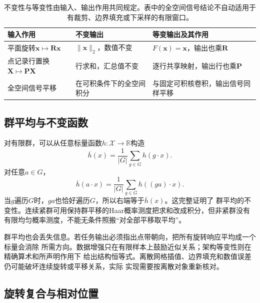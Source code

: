 \begin{table}[htbp]
 \centering\small
 \begin{tabularx}{\linewidth}{@{}lXX@{}}
 \toprule
 输入作用 & 不变输出 & 等变输出及其作用\\
 \midrule
 平面旋转$\bm x\mapsto\bm R\bm x$ & $\lVert\bm x\rVert_2$，数值不变 & $F(\bm x)=\bm x$，输出也乘$\bm R$\\
 点记录行置换$\bm X\mapsto\bm P\bm X$ & 行求和，汇总值不变 & 逐行共享映射，输出行也乘$\bm P$\\
 全空间信号平移 & 在可积条件下的全空间积分 & 与固定可积核卷积，输出信号同样平移\\
 \bottomrule
 \end{tabularx}
 \caption{不变性与等变性由输入、输出作用共同规定。表中的全空间信号结论不自动适用于有裁剪、边界填充或下采样的有限窗口。}
 \label{tab:geometry-invariance-equivariance}
\end{table}

\subsection{群平均与不变函数}

对有限群，可以从任意标量函数$h:\mathcal{X}\to\mathbb{R}$构造
\begin{equation}
  \overline{h}(x)
  =
  \frac{1}{|G|}
  \sum_{g\in G}h(g\cdot x).
  \label{eq:geometry-finite-group-averaging}
\end{equation}
对任意$a\in G$，
\[
  \overline{h}(a\cdot x)
  =
  \frac{1}{|G|}
  \sum_{g\in G}h((ga)\cdot x).
\]
当$g$遍历$G$时，$ga$也恰好遍历$G$，所以右端等于$\overline{h}(x)$。这完整证明了
群平均的不变性。连续紧群可用保持群平移的Haar概率测度把求和改成积分，但非紧群没有
有限均匀概率测度，不能无条件照搬“对全部平移取平均”。

群平均也会丢失信息。若任务输出必须指出点带朝向，把所有旋转响应平均成一个标量会消除
所需方向。数据增强只在有限样本上鼓励近似关系；架构等变性则在精确算术和所声明作用下
给出结构恒等式。离散网格插值、边界填充和数值误差仍可能破坏连续旋转或平移关系，实际
实现需要按离散对象重新核对。

\subsection{旋转复合与相对位置}

